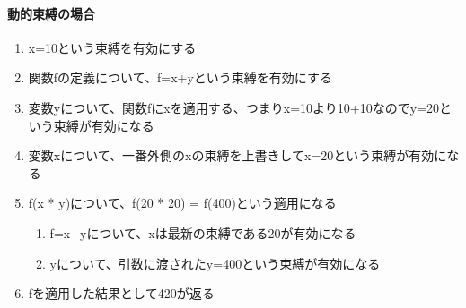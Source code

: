 \documentclass[a4paper,9pt]{jarticle}
\begin{document}
\paragraph{動的束縛の場合}
\begin{enumerate}
 \item x=10という束縛を有効にする
 \item 関数fの定義について、f=x+yという束縛を有効にする
 \item 変数yについて、関数fにxを適用する、つまりx=10より10+10なのでy=20という束縛が有効になる
 \item 変数xについて、一番外側のxの束縛を上書きしてx=20という束縛が有効になる
 \item f(x * y)について、f(20 * 20) = f(400)という適用になる
       \begin{enumerate}
        \item f=x+yについて、xは最新の束縛である20が有効になる
        \item yについて、引数に渡されたy=400という束縛が有効になる
       \end{enumerate}

 \item fを適用した結果として420が返る
\end{enumerate}
\end{document}
